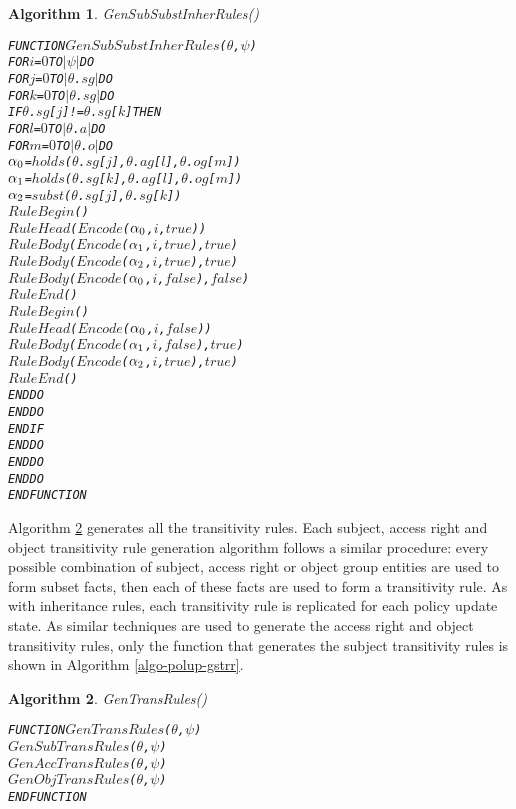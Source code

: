 \documentclass[11pt]{report}
\newenvironment{vverbatim}
{
  \begin{alltt}
}
{
    \vspace{-\baselineskip}
  \end{alltt}
}
\newtheorem{vvalgorithm}{Algorithm}[chapter]
\newenvironment{valgorithm}[2]
{
  \begin{vvalgorithm}{#1}
    \label{#2}
    \small
    \begin{vverbatim}
}
{
    \end{vverbatim}
  \end{vvalgorithm}
}
\begin{document}
          \begin{valgorithm}{GenSubSubstInherRules()}{algo-polup-gssir}
FUNCTION \(GenSubSubstInherRules\)(\(\theta\), \(\psi\))
  FOR \(i\) = \(0\) TO \(|\psi|\) DO
    FOR \(j\) = \(0\) TO \(|\)\(\theta\).\(sg\)\(|\) DO
      FOR \(k\) = \(0\) TO \(|\)\(\theta\).\(sg\)\(|\) DO
        IF \(\theta\).\(sg\)[\(j\)] != \(\theta\).\(sg\)[\(k\)] THEN
          FOR \(l\) = \(0\) TO \(|\)\(\theta\).\(a\)\(|\) DO
            FOR \(m\) = \(0\) TO \(|\)\(\theta\).\(o\)\(|\) DO
              \(\alpha\sb{0}\) = \(holds\)(\(\theta\).\(sg\)[\(j\)], \(\theta\).\(ag\)[\(l\)], \(\theta\).\(og\)[\(m\)])
              \(\alpha\sb{1}\) = \(holds\)(\(\theta\).\(sg\)[\(k\)], \(\theta\).\(ag\)[\(l\)], \(\theta\).\(og\)[\(m\)])
              \(\alpha\sb{2}\) = \(subst\)(\(\theta\).\(sg\)[\(j\)], \(\theta\).\(sg\)[\(k\)])
              \(RuleBegin\)()
              \(RuleHead\)(\(Encode\)(\(\alpha\sb{0}\), \(i\), \(true\)))
              \(RuleBody\)(\(Encode\)(\(\alpha\sb{1}\), \(i\), \(true\)), \(true\))
              \(RuleBody\)(\(Encode\)(\(\alpha\sb{2}\), \(i\), \(true\)), \(true\))
              \(RuleBody\)(\(Encode\)(\(\alpha\sb{0}\), \(i\), \(false\)), \(false\))
              \(RuleEnd\)()
              \(RuleBegin\)()
              \(RuleHead\)(\(Encode\)(\(\alpha\sb{0}\), \(i\), \(false\)))
              \(RuleBody\)(\(Encode\)(\(\alpha\sb{1}\), \(i\), \(false\)), \(true\))
              \(RuleBody\)(\(Encode\)(\(\alpha\sb{2}\), \(i\), \(true\)), \(true\))
              \(RuleEnd\)()
            ENDDO
          ENDDO
        ENDIF
      ENDDO
    ENDDO
  ENDDO
ENDFUNCTION
          \end{valgorithm}

          Algorithm \ref{algo-polup-gtrar} generates all the transitivity
          rules. Each subject, access right and object transitivity rule
          generation algorithm follows a similar procedure: every possible
          combination of subject, access right or object group entities are
          used to form subset facts, then each of these facts are used to
          form a transitivity rule. As with inheritance rules, each
          transitivity rule is replicated for each policy update state.
          As similar techniques are used to generate the access right and
          object transitivity rules, only the function that generates the
          subject transitivity rules is shown in Algorithm
          \ref{algo-polup-gstrr}.

          \begin{valgorithm}{GenTransRules()}{algo-polup-gtrar}
FUNCTION \(GenTransRules\)(\(\theta\), \(\psi\))
  \(GenSubTransRules\)(\(\theta\), \(\psi\))
  \(GenAccTransRules\)(\(\theta\), \(\psi\))
  \(GenObjTransRules\)(\(\theta\), \(\psi\))
ENDFUNCTION
          \end{valgorithm}
\end{document}
